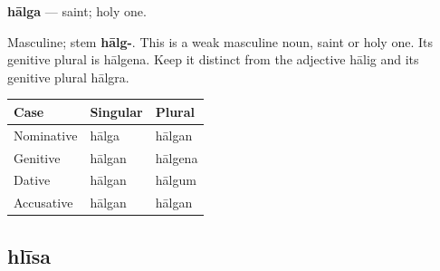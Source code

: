 \par\begin{minipage}{\linewidth}\raggedright
\textbf{hālga} — saint; holy one.

Masculine; stem \textbf{hālg-}. This is a weak masculine noun, saint or holy one. Its genitive plural is hālgena. Keep it distinct from the adjective hālig and its genitive plural hālgra.

\par\begingroup
\fontsize{10.5}{13.2}\selectfont
\setlength{\LTleft}{0pt}\setlength{\LTright}{\fill}
\noindent
\begin{tabular}{@{}>{\raggedright\arraybackslash}p{39.46mm}>{\raggedright\arraybackslash}p{39.46mm}>{\raggedright\arraybackslash}p{39.46mm}@{}}
\toprule
\textbf{Case} & \textbf{Singular} & \textbf{Plural} \\
\midrule
Nominative & hālga & hālgan \\
Genitive & hālgan & hālgena \\
Dative & hālgan & hālgum \\
Accusative & hālgan & hālgan \\
\bottomrule
\end{tabular}
\par\endgroup

\end{minipage}\par
{}
\subsection*{hlīsa}

